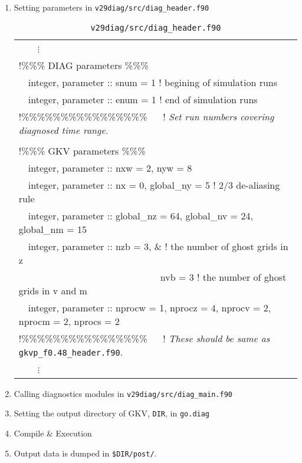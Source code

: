 \begin{enumerate}
  \item Setting parameters in \texttt{v29diag/src/diag\_header.f90}
\begin{table}[h!]
  \caption{\texttt{v29diag/src/diag\_header.f90}}
  \centering
  \begin{tabular}{| l |}
  \hline
  ~~~~$\vdots$ \\
!\%\%\% DIAG parameters \%\%\%\\
  ~~integer, parameter :: snum = 1      ! begining of simulation runs\\
  ~~integer, parameter :: enum = 1      ! end of simulation runs\\
!\%\%\%\%\%\%\%\%\%\%\%\%\%\%\%\% ~~ ! \textit{Set run numbers covering diagnosed time range.}\\
\\
!\%\%\% GKV parameters \%\%\%\\
  ~~integer, parameter :: nxw = 2, nyw = 8\\
  ~~integer, parameter :: nx = 0, global\_ny = 5 ! 2/3 de-aliasing rule\\
  ~~integer, parameter :: global\_nz = 64, global\_nv = 24, global\_nm = 15\\
  ~~integer, parameter :: nzb = 3, \& ! the number of ghost grids in z\\
  ~~~~~~~~~~~~~~~~~~~~~~~~~~~~~~nvb = 3 ! the number of ghost grids in v and m\\
  ~~integer, parameter :: nprocw = 1, nprocz = 4, nprocv = 2, nprocm = 2, nprocs = 2\\
!\%\%\%\%\%\%\%\%\%\%\%\%\%\%\%\% ~~ ! \textit{These should be same as} \texttt{gkvp\_f0.48\_header.f90}.\\
  ~~~~$\vdots$ \\
  \hline
  \end{tabular}
\end{table}
  \item Calling diagnostics modules in \texttt{v29diag/src/diag\_main.f90}
  \item Setting the output directory of GKV, \texttt{DIR}, in \texttt{go.diag}
  \item Compile \& Execution
  \item Output data is dumped in \texttt{\$DIR/post/}. 
\end{enumerate}

